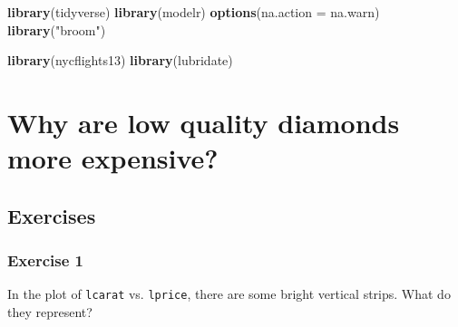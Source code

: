 \documentclass[]{book}
\newenvironment{Shaded}{\begin{snugshade}}{\end{snugshade}}
\newcommand{\DataTypeTok}[1]{\textcolor[rgb]{0.13,0.29,0.53}{#1}}
\newcommand{\FloatTok}[1]{\textcolor[rgb]{0.00,0.00,0.81}{#1}}
\newcommand{\KeywordTok}[1]{\textcolor[rgb]{0.13,0.29,0.53}{\textbf{#1}}}
\newcommand{\NormalTok}[1]{#1}
\newcommand{\OperatorTok}[1]{\textcolor[rgb]{0.81,0.36,0.00}{\textbf{#1}}}
\newcommand{\StringTok}[1]{\textcolor[rgb]{0.31,0.60,0.02}{#1}}
\theoremstyle{definition}
\theoremstyle{definition}
\theoremstyle{definition}
\theoremstyle{remark}
\begin{document}
\begin{Shaded}
\begin{Highlighting}[]
\KeywordTok{library}\NormalTok{(tidyverse)}
\KeywordTok{library}\NormalTok{(modelr)}
\KeywordTok{options}\NormalTok{(}\DataTypeTok{na.action =}\NormalTok{ na.warn)}
\KeywordTok{library}\NormalTok{(}\StringTok{"broom"}\NormalTok{)}

\KeywordTok{library}\NormalTok{(nycflights13)}
\KeywordTok{library}\NormalTok{(lubridate)}
\end{Highlighting}
\end{Shaded}

\hypertarget{why-are-low-quality-diamonds-more-expensive}{%
\section{Why are low quality diamonds more
expensive?}\label{why-are-low-quality-diamonds-more-expensive}}

\begin{Shaded}
\end{Shaded}

\hypertarget{exercises-2}{%
\subsection{Exercises}\label{exercises-2}}

\hypertarget{exercise-1-60}{%
\subsubsection{Exercise 1}\label{exercise-1-60}}

In the plot of \texttt{lcarat} vs. \texttt{lprice}, there are some
bright vertical strips. What do they represent?
\end{document}
